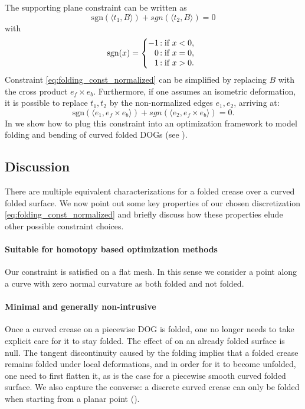 The supporting plane constraint can be written as
\begin{equation} \label{eq:folding_const_normalized} 
\text{sgn}(\langle t_1,B\rangle) +  {sgn}(\langle t_2,B\rangle) = 0
\end{equation}
with 
\begin{equation} \label{eq:sign}
\text{sgn}(x) = \left\{
     \begin{array}{@{}r@{\thinspace}l}
       -1  &: \text{if } x < 0, \\
       0 &: \text{if } x = 0, \\
       1 &: \text{if } x > 0. \\
     \end{array}
   \right.
\end{equation}
%
Constraint \eqref{eq:folding_const_normalized} can be simplified by replacing $B$ with the cross product $e_f \times e_b$. Furthermore, if one assumes an isometric deformation, it is possible to replace $t_1,t_2$ by the non-normalized edges $e_1,e_2$, arriving at:
\begin{equation} \label{eq:folding_const}
\text{sgn}(\langle e_1,e_f \times e_b \rangle) +  {sgn}(\langle e_2,e_f \times e_b\rangle) = 0.
\end{equation}
In  we show how to plug this constraint into an optimization framework to model folding and bending of curved folded DOGs (see ).

\subsection{Discussion}
There are multiple equivalent characterizations for a folded crease over a curved folded surface. We now point out some key properties of our chosen discretization \eqref{eq:folding_const_normalized} and briefly discuss how these properties elude other possible constraint choices.

\paragraph{Suitable for homotopy based optimization methods} 
Our constraint is satisfied on a flat mesh. In this sense we consider a point along a curve with zero normal curvature as both folded and not folded.
 
\paragraph{Minimal and generally non-intrusive} 
Once a curved crease on a piecewise DOG is folded, one no longer needs to take explicit care for it to stay folded. The effect of  on an already folded surface is null. The tangent discontinuity caused by the folding implies that a folded crease remains folded under local deformations, and in order for it to become unfolded, one need to first flatten it, as is the case for a piecewise smooth curved folded surface. We also capture the converse: a discrete curved crease can only be folded when starting from a planar point (). \\

